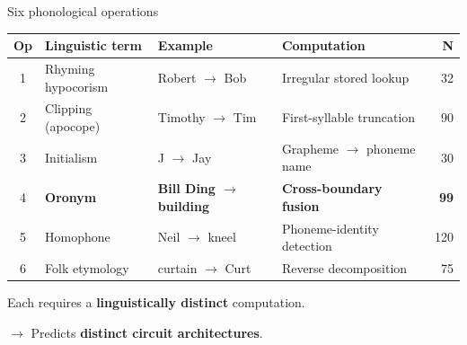 \documentclass[10pt,aspectratio=169]{beamer}
\begin{document}
\begin{frame}{Six phonological operations}
\hypertarget{sl:operations}{}

\begin{center}
\small
\begin{tabular}{clllr}
\toprule
\textbf{Op} & \textbf{Linguistic term} & \textbf{Example} & \textbf{Computation} & \textbf{N} \\
\midrule
1 & Rhyming hypocorism & Robert $\to$ Bob & Irregular stored lookup & 32 \\
2 & Clipping (apocope) & Timothy $\to$ Tim & First-syllable truncation & 90 \\
3 & Initialism & J $\to$ Jay & Grapheme $\to$ phoneme name & 30 \\
4 & \textbf{Oronym} & \textbf{Bill Ding $\to$ building} & \textbf{Cross-boundary fusion} & \textbf{99} \\
5 & Homophone & Neil $\to$ kneel & Phoneme-identity detection & 120 \\
6 & Folk etymology & curtain $\to$ Curt & Reverse decomposition & 75 \\
\bottomrule
\end{tabular}
\end{center}

\vspace{0.5em}
Each requires a \textbf{linguistically distinct} computation.

$\to$ Predicts \textbf{distinct circuit architectures}.
\end{frame}
\end{document}
